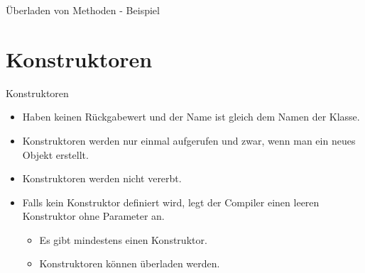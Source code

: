 \documentclass{../tuda-beamer}
\begin{document}
    \begin{frame}[c]{Überladen von Methoden - Beispiel}
        
    \end{frame}

    \begin{frame}[c]
        
    \end{frame}


    \section{Konstruktoren}
    \begin{frame}{Konstruktoren}
        \begin{itemize}
            \item Haben keinen Rückgabewert und der Name ist gleich dem Namen der Klasse.
            \item Konstruktoren werden nur einmal aufgerufen und zwar, wenn man ein neues Objekt
            erstellt.
            \item Konstruktoren werden nicht vererbt.
            \item Falls kein Konstruktor definiert wird, legt der Compiler einen leeren
            Konstruktor ohne Parameter an.
            \begin{itemize}
                \item Es gibt mindestens einen Konstruktor.
                \item Konstruktoren können überladen werden.
            \end{itemize}

            
        \end{itemize}
    \end{frame}

    \begin{frame}[c]
        
    \end{frame}
\end{document}

